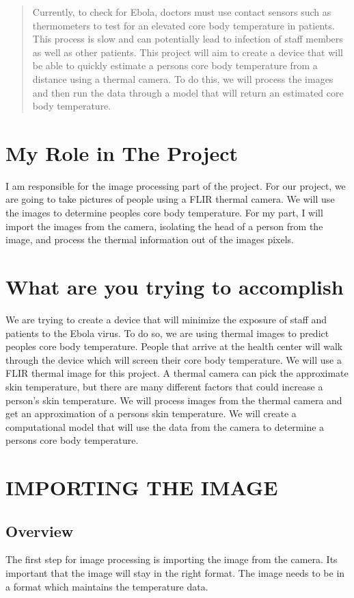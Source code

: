 \begin{abstract}
Currently, to check for Ebola, doctors must use contact sensors such as thermometers to test for an elevated core body
temperature in patients. This process is slow and can potentially lead to infection of staff members as well as other patients. This
project will aim to create a device that will be able to quickly estimate a persons core body temperature from a distance using a
thermal camera. To do this, we will process the images and then run the data through a model that will return an estimated core body
temperature.
\end{abstract}

\section*{My Role in The Project}
	I am responsible for the image processing part of the project. For our project, we are going to take pictures of people
	using a FLIR thermal camera. We will use the images to determine peoples core body temperature. For my part, I will
	import the images from the camera, isolating the head of a person from the image, and process the thermal information
	out of the images pixels.

\section*{What are you trying to accomplish}
	We are trying to create a device that will minimize the exposure of staff and patients to the Ebola virus. To do so, we
	are using thermal images to predict peoples core body temperature. People that arrive at the health center will walk
	through the device which will screen their core body temperature. We will use a FLIR thermal image for this project. A
	thermal camera can pick the approximate skin temperature, but there are many different factors that could increase a
	person’s skin temperature. We will process images from the thermal camera and get an approximation of a persons skin
	temperature. We will create a computational model that will use the data from the camera to determine a persons core
	body temperature.

\section*{IMPORTING THE IMAGE}
	\subsection*{Overview}
	The first step for image processing is importing the image from the camera. Its important that the image will stay in the
	right format. The image needs to be in a format which maintains the temperature data.
